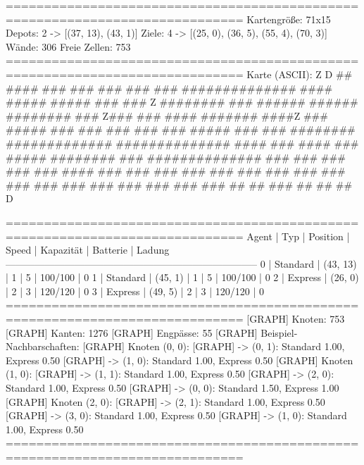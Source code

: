 =============================================================================
Kartengröße:           71x15
Depots:                2 -> [(37, 13), (43, 1)]
Ziele:                 4 -> [(25, 0), (36, 5), (55, 4), (70, 3)]
Wände:                 306
Freie Zellen:          753
=============================================================================
Karte (ASCII):
                         Z
                                           D
   ##       ####     ###       ###     ###         ###  ###
  ##############     ####     #####    #####       ###  ###           Z
  ########   ###    ######   ######    ########    ### Z###
  ###              #### ####### ####Z  ###  #####  ###  ###      ###
  ###              ###   #####   ###   ###    ########  #############
  ##############  ####    ###    ####  ###       #####  ########  ###
  ##############          ###          ###         ###  ###       ###
  ####       ###          ###          ###              ###       ###
  ###        ###          ###          ###              ###       ###
  ###        ###          ###          ###              ###       ###
   ##         ##          ###           ##              ##         ##
                                     D

=============================================================================
 Agent | Typ       | Position    | Speed   | Kapazität  | Batterie  | Ladung
-----------------------------------------------------------------------------
 0     | Standard  | (43, 13)    | 1       | 5          | 100/100   | 0
 1     | Standard  | (45, 1)     | 1       | 5          | 100/100   | 0
 2     | Express   | (26, 0)     | 2       | 3          | 120/120   | 0
 3     | Express   | (49, 5)     | 2       | 3          | 120/120   | 0
=============================================================================
[GRAPH]    Knoten:              753
[GRAPH]    Kanten:              1276
[GRAPH]    Engpässe:            55
[GRAPH]    Beispiel-Nachbarschaften:
[GRAPH]      Knoten (0, 0):
[GRAPH]        -> (0, 1): Standard 1.00, Express 0.50
[GRAPH]        -> (1, 0): Standard 1.00, Express 0.50
[GRAPH]      Knoten (1, 0):
[GRAPH]        -> (1, 1): Standard 1.00, Express 0.50
[GRAPH]        -> (2, 0): Standard 1.00, Express 0.50
[GRAPH]        -> (0, 0): Standard 1.50, Express 1.00
[GRAPH]      Knoten (2, 0):
[GRAPH]        -> (2, 1): Standard 1.00, Express 0.50
[GRAPH]        -> (3, 0): Standard 1.00, Express 0.50
[GRAPH]        -> (1, 0): Standard 1.00, Express 0.50
=============================================================================